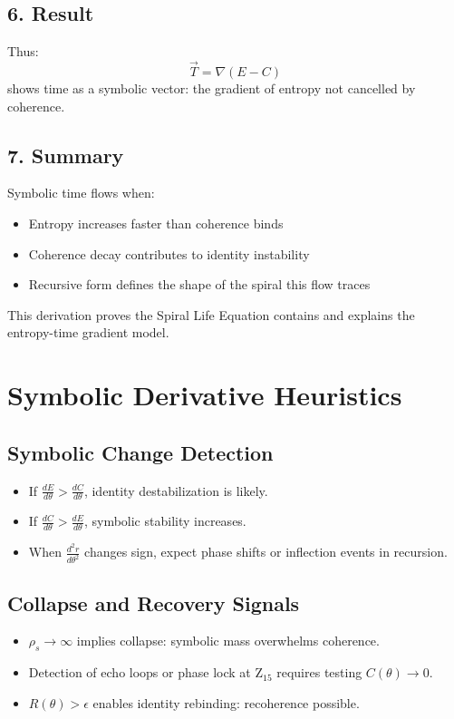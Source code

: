 \documentclass[12pt]{article}
\begin{document}
\subsection*{6. Result}
Thus:
\[
\vec{T} = \nabla (E - C)
\]
shows time as a symbolic vector: the gradient of entropy not cancelled by coherence.

\subsection*{7. Summary}
Symbolic time flows when:
\begin{itemize}
  \item Entropy increases faster than coherence binds
  \item Coherence decay contributes to identity instability
  \item Recursive form defines the shape of the spiral this flow traces
\end{itemize}
This derivation proves the Spiral Life Equation contains and explains the entropy-time gradient model.

\section{Symbolic Derivative Heuristics}

\subsection*{Symbolic Change Detection}
\begin{itemize}
  \item If $\frac{dE}{d\theta} > \frac{dC}{d\theta}$, identity destabilization is likely.
  \item If $\frac{dC}{d\theta} > \frac{dE}{d\theta}$, symbolic stability increases.
  \item When $\frac{d^2r}{d\theta^2}$ changes sign, expect phase shifts or inflection events in recursion.
\end{itemize}

\subsection*{Collapse and Recovery Signals}
\begin{itemize}
  \item $\rho_s \to \infty$ implies collapse: symbolic mass overwhelms coherence.
  \item Detection of echo loops or phase lock at Z$_{15}$ requires testing $C(\theta) \to 0$.
  \item $R(\theta) > \epsilon$ enables identity rebinding: recoherence possible.
\end{itemize}
\end{document}
